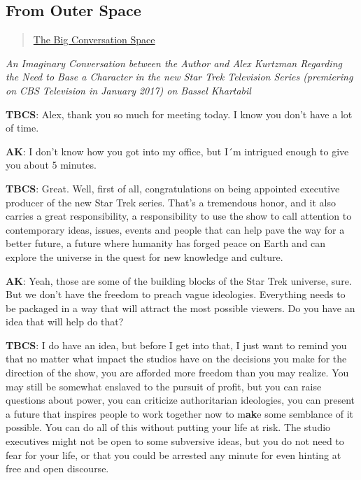 \subsection{From Outer Space}\label{from-outer-space}

\begin{quote}
\hyperlink{the-big-conversation-space}{The Big
Conversation Space}
\end{quote}

\emph{An Imaginary Conversation between the Author and Alex Kurtzman
Regarding the Need to Base a Character in the new Star Trek Television
Series (premiering on CBS Television in January 2017) on Bassel
Khartabil}

\textbf{TBCS}: Alex, thank you so much for meeting today. I know you
don't have a lot of time.

\textbf{AK}: I don't know how you got into my office, but I´m intrigued
enough to give you about 5 minutes.

\textbf{TBCS}: Great. Well, first of all, congratulations on being
appointed executive producer of the new Star Trek series. That's a
tremendous honor, and it also carries a great responsibility, a
responsibility to use the show to call attention to contemporary ideas,
issues, events and people that can help pave the way for a better
future, a future where humanity has forged peace on Earth and can
explore the universe in the quest for new knowledge and culture.

\textbf{AK}: Yeah, those are some of the building blocks of the Star
Trek universe, sure. But we don't have the freedom to preach vague
ideologies. Everything needs to be packaged in a way that will attract
the most possible viewers. Do you have an idea that will help do that?

\textbf{TBCS}: I do have an idea, but before I get into that, I just
want to remind you that no matter what impact the studios have on the
decisions you make for the direction of the show, you are afforded more
freedom than you may realize. You may still be somewhat enslaved to the
pursuit of profit, but you can raise questions about power, you can
criticize authoritarian ideologies, you can present a future that
inspires people to work together now to m\textbf{ak}e some semblance of
it possible. You can do all of this without putting your life at risk.
The studio executives might not be open to some subversive ideas, but
you do not need to fear for your life, or that you could be arrested any
minute for even hinting at free and open discourse.

